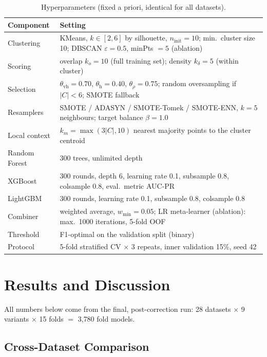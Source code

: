 \documentclass[11pt,a4paper]{article}
\begin{document}
\begin{table}[t]\centering\small
\caption{Hyperparameters (fixed a priori, identical for all datasets).}\label{tab:hyper}
\begin{tabular}{lp{10.5cm}}
\toprule
Component & Setting \\
\midrule
Clustering & KMeans, $k\in[2,6]$ by silhouette, $n_{\mathrm{init}}=10$; min.\ cluster size 10; DBSCAN $\varepsilon=0.5$, minPts $=5$ (ablation) \\
Scoring & overlap $k_o=10$ (full training set); density $k_\delta=5$ (within cluster) \\
Selection & $\theta_{\mathrm{vh}}=0.70$, $\theta_{\mathrm{h}}=0.40$, $\theta_\rho=0.75$; random oversampling if $|C|<6$; SMOTE fallback \\
Resamplers & SMOTE / ADASYN / SMOTE-Tomek / SMOTE-ENN, $k=5$ neighbours; target balance $\beta=1.0$ \\
Local context & $k_m=\max(3|C|,10)$ nearest majority points to the cluster centroid \\
Random Forest & 300 trees, unlimited depth \\
XGBoost & 300 rounds, depth 6, learning rate 0.1, subsample 0.8, colsample 0.8, eval.\ metric AUC-PR \\
LightGBM & 300 rounds, learning rate 0.1, subsample 0.8, colsample 0.8 \\
Combiner & weighted average, $w_{\min}=0.05$; LR meta-learner (ablation): max.\ 1000 iterations, 5-fold OOF \\
Threshold & F1-optimal on the validation split (binary) \\
Protocol & 5-fold stratified CV $\times$ 3 repeats, inner validation 15\%, seed 42 \\
\bottomrule
\end{tabular}
\end{table}

\section{Results and Discussion}\label{sec:results}

All numbers below come from the final, post-correction run: 28 datasets $\times$ 9 variants $\times$ 15 folds $=$ 3{,}780 fold models.

\subsection{Cross-Dataset Comparison}
\end{document}
